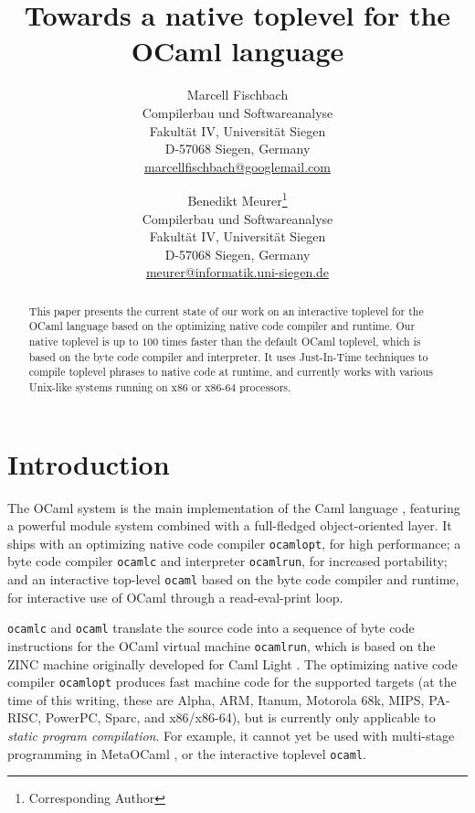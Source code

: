 \documentclass[10pt,a4paper,final,twocolumn]{article}
\begin{document}
\title{%
  Towards a native toplevel for the OCaml language
}
\author{%
  Marcell Fischbach \\
  Compilerbau und Softwareanalyse \\
  Fakult\"at IV, Universit\"at Siegen \\
  D-57068 Siegen, Germany \\
  \url{marcellfischbach@googlemail.com}
  \and
  Benedikt Meurer\thanks{Corresponding Author} \\
  Compilerbau und Softwareanalyse \\
  Fakult\"at IV, Universit\"at Siegen \\
  D-57068 Siegen, Germany \\
  \url{meurer@informatik.uni-siegen.de}
}
\date{}

\maketitle

\begin{abstract}
  This paper presents the current state of our work on an interactive toplevel for the OCaml language
  based on the optimizing native code compiler and runtime. Our native toplevel is up to $100$ times
  faster than the default OCaml toplevel, which is based on the byte code compiler and interpreter.
  It uses Just-In-Time techniques to compile toplevel phrases to native code at runtime, and
  currently works with various Unix-like systems running on x86 or x86-64 processors.
\end{abstract}


\section{Introduction}

The OCaml \cite{Leroy11,Remy02} system is the main implementation of the Caml
language \cite{Caml11}, featuring a powerful module system
combined with a full-fledged object-oriented layer. It ships with an optimizing native
code compiler \texttt{ocamlopt}, for high performance; a byte code compiler \texttt{ocamlc}
and interpreter \texttt{ocamlrun}, for increased portability; and an interactive top-level
\texttt{ocaml} based on the byte code compiler and runtime, for interactive use of OCaml
through a read-eval-print loop.

\texttt{ocamlc} and \texttt{ocaml} translate the source code into a sequence of byte code
instructions for the OCaml virtual machine \texttt{ocamlrun}, which is based on the ZINC
machine \cite{Leroy90} originally developed for Caml Light \cite{Leroy02}. The optimizing
native code compiler \texttt{ocamlopt} produces fast machine code for the supported targets
(at the time of this writing, these are Alpha, ARM, Itanum, Motorola 68k, MIPS, PA-RISC, PowerPC,
Sparc, and x86/x86-64), but is currently only applicable to \emph{static program compilation}.
For example, it cannot yet be used with multi-stage programming in MetaOCaml \cite{Taha03,Taha06},
or the interactive toplevel \texttt{ocaml}.
\end{document}
